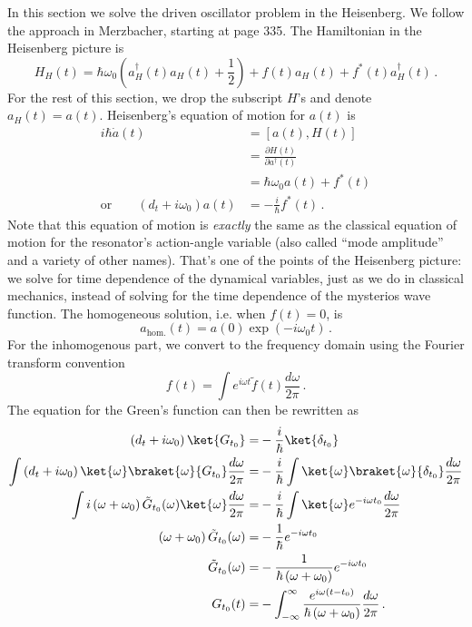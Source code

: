In this section we solve the driven oscillator problem in the Heisenberg.
We follow the approach in Merzbacher, starting at page 335.
The Hamiltonian in the Heisenberg picture is
\begin{equation}
  H_H(t)
  = \hbar \omega_0 \left( a_H^{\dagger}(t)a_H(t) + \frac{1}{2} \right) + f(t)a_H(t) + f^{*}(t)a_H^{\dagger}(t)
  \, .
\end{equation}
For the rest of this section, we drop the subscript $H$'s and denote $a_H(t) = a(t)$.
Heisenberg's equation of motion for $a(t)$ is
\begin{align*}
  i\hbar\dot{a}(t)
  &= \left[ a(t), H(t) \right] \\
  &= \frac{\partial H(t)}{\partial a^{\dagger}(t)} \\
  &= \hbar\omega_0 a(t) + f^{*}(t) \\
  \textrm{or} \qquad
  \left(d_{t}+i\omega_0\right)a(t) &= -\frac{i}{\hbar}f^{*}(t)
  \, .
\end{align*}
Note that this equation of motion is \emph{exactly} the same as the classical equation of motion for the resonator's action-angle variable (also called ``mode amplitude'' and a variety of other names).
That's one of the points of the Heisenberg picture: we solve for time dependence of the dynamical variables, just as we do in classical mechanics, instead of solving for the time dependence of the mysterios wave function.
The homogeneous solution, i.e. when $f(t) = 0$, is
\begin{equation}
  a_\text{hom.}(t) = a(0) \exp(-i \omega_0 t) \, .
\end{equation}
For the inhomogenous part, we convert to the frequency domain using the Fourier transform convention
\begin{equation}
  f(t) = \int e^{i\omega t} \tilde{f}(t) \frac{d\omega}{2\pi}
  \, .
\end{equation}
The equation for the Green's function can then be rewritten as
\begin{align*}
  \left(d_{t} + i \omega_0 \right) \ket{G_{t_0}}
  =& -\frac{i}{\hbar} \ket{\delta_{t_0}} \\
  \int \left(d_{t} + i \omega_0 \right) \ket{\omega} \braket{\omega}{G_{t_0}} \frac{d\omega}{2\pi}
  =& -\frac{i}{\hbar} \int \ket{\omega}\braket{\omega}{\delta_{t_0}} \frac{d\omega}{2\pi} \\
  \int i\left(\omega + \omega_0 \right) \tilde{G}_{t_0}(\omega) \ket{\omega} \frac{d\omega}{2\pi}
  =& -\frac{i}{\hbar} \int \ket{\omega} e^{-i\omega t_0} \frac{d\omega}{2\pi} \\
  \left(\omega + \omega_0 \right) \tilde{G}_{t_0}(\omega)
  =& -\frac{1}{\hbar} e^{-i\omega t_0} \\
  \tilde{G}_{t_0}(\omega)
  =& -\frac{1}{\hbar \left( \omega + \omega_0 \right)} e^{-i \omega t_0} \\
  G_{t_0}(t)
  =& -\int_{-\infty}^{\infty}\frac{e^{i\omega(t - t_0)}}{\hbar \left(\omega + \omega_0 \right)}\frac{d\omega}{2\pi}
  \, .
\end{align*}

